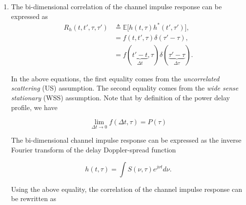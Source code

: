 \documentclass [a4paper, 11pt] {article}
\begin{document}
   \begin{solution}
       \begin{enumerate}
            \item The bi-dimensional correlation of the channel impulse response can be expressed as
            \begin{align}
                R_h(t,t',\tau,\tau') &\triangleq \mathbb{E}\Big[h(t,\tau)h^*(t',\tau')\Big],\\
                &= f(t,t',\tau)\delta(\tau'-\tau),\\
                &= f(\underbrace{t'-t}_{\Delta t},\tau)\delta(\underbrace{\tau'-\tau}_{\Delta \tau }).
            \end{align}

            In the above equations, the first equality comes from the \textit{uncorrelated scattering} (US) assumption. The second equality comes from the \textit{wide sense stationary} (WSS) assumption. Note that by definition of the power delay profile, we have

            \begin{equation*}
                \lim_{\Delta t \rightarrow 0} f(\Delta t, \tau) = P(\tau)
            \end{equation*}

            The bi-dimensional channel impulse response can be expressed as the inverse Fourier transform of the delay Doppler-spread function

            \begin{equation}
                h(t,\tau) =\int S(\nu,\tau)e^{j\nu t}d\nu.
            \end{equation}

            Using the above equality, the correlation of the channel impulse response can be rewritten as


\end{enumerate}
\end{solution}
\end{document}
